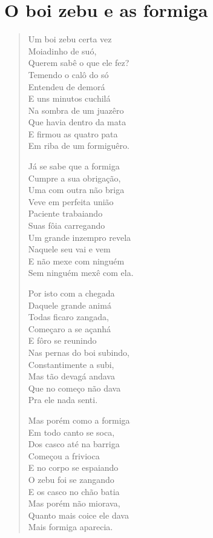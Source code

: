 \chapter{O boi zebu e as formiga}

\begin{verse}
Um boi zebu certa vez\\
Moiadinho de suó,\\
Querem sabê o que ele fez?\\
Temendo o calô do só\\
Entendeu de demorá\\
E uns minutos cuchilá\\
Na sombra de um juazêro\\
Que havia dentro da mata\\
E firmou as quatro pata\\
Em riba de um formiguêro.

Já se sabe que a formiga\\
Cumpre a sua obrigação,\\
Uma com outra não briga\\
Veve em perfeita união\\
Paciente trabaiando\\
Suas fôia carregando\\
Um grande inzempro revela\\
Naquele seu vai e vem\\
E não mexe com ninguém\\
Sem ninguém mexê com ela.

Por isto com a chegada\\
Daquele grande animá\\
Todas ficaro zangada,\\
Começaro a se açanhá\\
E fôro se reunindo\\
Nas pernas do boi subindo,\\
Constantimente a subi,\\
Mas tão devagá andava\\
Que no começo não dava\\
Pra ele nada senti.

Mas porém como a formiga\\
Em todo canto se soca,\\
Dos casco até na barriga\\
Começou a frivioca\\
E no corpo se espaiando\\
O zebu foi se zangando\\
E os casco no chão batia\\
Mas porém não miorava,\\
Quanto mais coice ele dava\\
Mais formiga aparecia.


\end{verse}
